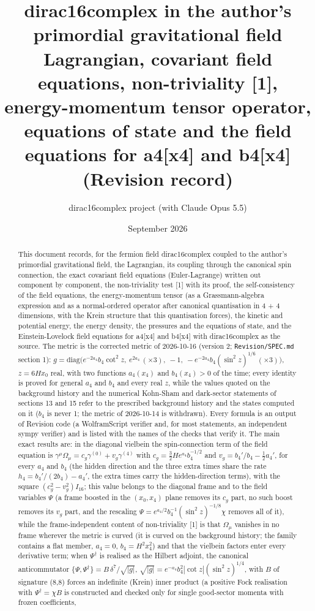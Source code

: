 \documentclass[11pt]{article}
\title{dirac16complex in the author's primordial gravitational field\\[0.5em]\large Lagrangian, covariant field equations, non-triviality [1], energy-momentum tensor operator, equations of state and the field equations for a4[x4] and b4[x4] (Revision record)}
\author{dirac16complex project (with Claude Opus 5.5)}
\date{September 2026}
\begin{document}
\maketitle
\tableofcontents
\newpage
\begin{abstract}
This document records, for the fermion field dirac16complex coupled to the author's primordial gravitational field, the Lagrangian, its coupling through the canonical spin connection, the exact covariant field equations (Euler-Lagrange) written out component by component, the non-triviality test [1] with its proof, the self-consistency of the field equations, the energy-momentum tensor (as a Grassmann-algebra expression and as a normal-ordered operator after canonical quantisation in 4 + 4 dimensions, with the Krein structure that this quantisation forces), the kinetic and potential energy, the energy density, the pressures and the equations of state, and the Einstein-Lovelock field equations for a4[x4] and b4[x4] with dirac16complex as the source. The metric is the corrected metric of 2026-10-16 (version 2; \texttt{Revision\allowbreak{}/SPEC.md} section 1): $g = \mathrm{diag}\big(e^{-2a_4}b_4\cot^2 z,\ e^{2a_4}\,(\times3),\ -1,\ -e^{-2a_4}b_4(\sin^2 z)^{1/6}\,(\times3)\big)$, $z = 6Hx_0$ real, with two functions $a_4(x_4)$ and $b_4(x_4) > 0$ of the time; every identity is proved for general $a_4$ and $b_4$ and every real $z$, while the values quoted on the background history and the numerical Kohn-Sham and dark-sector statements of sections 13 and 15 refer to the prescribed background history and the states computed on it ($b_4$ is never 1; the metric of 2026-10-14 is withdrawn). Every formula is an output of Revision code (a WolframScript verifier and, for most statements, an independent sympy verifier) and is listed with the names of the checks that verify it. The main exact results are: in the diagonal vielbein the spin-connection term of the field equation is $\gamma^\mu\Omega_\mu = c_g\gamma^{(0)} + v_g\gamma^{(4)}$ with $c_g = \tfrac32He^{a_4}b_4^{-1/2}$ and $v_g = b_4'/b_4 - \tfrac12a_4'$, for every $a_4$ and $b_4$ (the hidden direction and the three extra times share the rate $h_4 = b_4'/(2b_4) - a_4'$, the extra times carry the hidden-direction terms), with the square $(c_g^2 - v_g^2)I_{16}$; this value belongs to the diagonal frame and to the field variables $\Psi$ (a frame boosted in the $(x_0, x_4)$ plane removes its $c_g$ part, no such boost removes its $v_g$ part, and the rescaling $\Psi = e^{a_4/2}b_4^{-1}(\sin^2 z)^{-1/8}\chi$ removes all of it), while the frame-independent content of non-triviality [1] is that $\Omega_\mu$ vanishes in no frame wherever the metric is curved (it is curved on the background history; the family contains a flat member, $a_4 = 0$, $b_4 = H^2x_4^2$) and that the vielbein factors enter every derivative term; when $\Psi^\dagger$ is realised as the Hilbert adjoint, the canonical anticommutator $\{\Psi, \Psi^\dagger\} = B\,\delta^7/\sqrt{|g|}$, $\sqrt{|g|} = e^{-a_4}b_4^2|\cot z|(\sin^2 z)^{1/4}$, with $B$ of signature (8,8) forces an indefinite (Krein) inner product (a positive Fock realisation with $\Psi^\dagger = \chi B$ is constructed and checked only for single good-sector momenta with frozen coefficients, 
\end{abstract}
\end{document}
